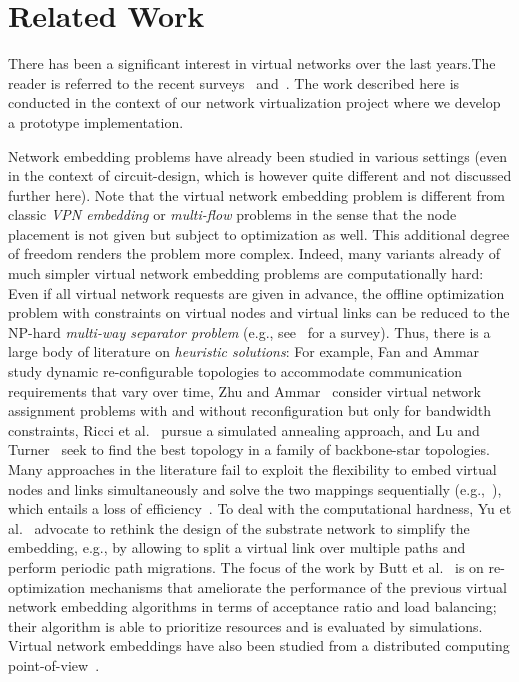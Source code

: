 \documentclass[conference,10pt]{IEEEtran}
\begin{document}
\section{Related Work} \label{sec:relwork}

There has been a significant interest in virtual networks over the
last years.The reader is
referred to the recent surveys~\cite{virsurvey} and~\cite{chalsurvey}. The
work described here is conducted in the context of our network
virtualization project where we develop a prototype implementation.

Network embedding problems have already been studied in various
settings (even in the context of circuit-design, which is however
quite different and not discussed further here). Note that the
virtual network embedding problem is different from classic
\emph{VPN embedding} or \emph{multi-flow} problems in the sense that
the node placement is not given but subject to optimization as well.
This additional degree of freedom renders the problem more complex.
Indeed, many variants already of much simpler virtual network
embedding problems are computationally hard: Even if all virtual
network requests are given in advance, the offline optimization
problem with constraints on virtual nodes and virtual links can be
reduced to the NP-hard \emph{multi-way separator problem} (e.g.,
see~\cite{nphard} for a survey). Thus, there is a large body of
literature on \emph{heuristic solutions}: For example, Fan and
Ammar~\cite{ammar} study dynamic re-configurable topologies to
accommodate communication requirements that vary over time, Zhu and
Ammar~\cite{zhu06} consider virtual network assignment problems with
and without reconfiguration but only for bandwidth constraints,
Ricci et al.~\cite{simannealing} pursue a simulated annealing
approach, and Lu and Turner~\cite{turner} seek to find the best
topology in a family of backbone-star topologies. Many approaches in
the literature fail to exploit the flexibility to embed virtual
nodes and links simultaneously and solve the two mappings
sequentially (e.g.,~\cite{pb-embed}), which entails a loss of
efficiency~\cite{isosub}. To deal with the computational hardness,
Yu et al.~\cite{rethinking} advocate to rethink the design of the
substrate network to simplify the embedding, e.g., by allowing to
split a virtual link over multiple paths and perform periodic path
migrations. The focus of the work by Butt et
al.~\cite{topoawareness} is on re-optimization mechanisms that
ameliorate the performance of the previous virtual network embedding
algorithms in terms of acceptance ratio and load balancing; their
algorithm is able to prioritize resources and is evaluated by
simulations. Virtual network embeddings have also been
studied from a distributed computing
point-of-view~\cite{distmapping}.
\end{document}
